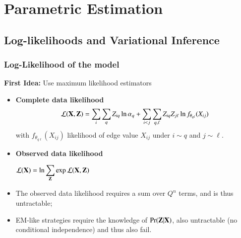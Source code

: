 \documentclass{beamer}
\newcommand{\Zbf}{{\bf Z}}
\newcommand{\Xbf}{{\bf X}}
\begin{document}




\section{Parametric Estimation}

\subsection{Log-likelihoods and Variational Inference}

\begin{frame}
  \frametitle{Log-Likelihood of the model}
  \textbf{First Idea:} Use maximum likelihood estimators
  \begin{itemize}
  \item \textbf{Complete data likelihood}
    \[
    \mathcal{L}(\Xbf,\Zbf) = \sum_i \sum_q Z_{iq}\ln{\alpha_q} +
    \sum_{i < j} \sum_{q,\ell} Z_{iq} Z_{j\ell}
    \ln{f_{\theta_{q\ell}}(X_{ij})}
    \]
    with $f_{\theta_{q\ell}}(X_{ij})$ likelihood of edge value
    $X_{ij}$ under $i \sim q$ and $j \sim \ell$.
    \pause
  \item \textbf{Observed data likelihood}
    \begin{center}
      $ \displaystyle \mathcal{L}(\Xbf) = \ln{\sum_{\Zbf}
        \exp{\mathcal{L}(\Xbf,\Zbf)}}
      $
    \end{center}
    \pause
  \item The observed data likelihood requires a sum over $Q^n$
    terms, and is thus \alert{untractable}; \medskip
  \item EM-like strategies require the knowledge of
    $\Pr(\Zbf|\Xbf)$, also untractable (no conditional independence) and thus also
    fail.
  \end{itemize}
\end{frame}
\end{document}
